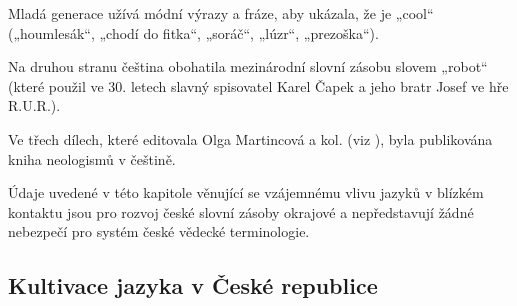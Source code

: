 \begin{multicols}{2}
Mladá generace užívá módní výrazy a fráze, aby ukázala, že je „cool“ („houmlesák“, „chodí do fitka“, „soráč“, „lúzr“, „prezoška“).\vspace*{-0.009cm}

Na druhou stranu čeština obohatila mezinárodní slovní zásobu slovem „robot“ (které použil ve 30. letech slavný spisovatel Karel Čapek a jeho bratr Josef ve hře R.U.R.).

Ve třech dílech, které editovala Olga Martincová a kol. (viz \cite{Martincova}), byla publikována kniha neologismů v češtině.

Údaje uvedené v této kapitole věnující se vzájemnému vlivu jazyků v blízkém kontaktu jsou pro rozvoj české slovní zásoby okrajové a nepředstavují žádné nebezpečí pro systém české vědecké terminologie.
  
\subsection{Kultivace jazyka v České republice}


\end{multicols}
